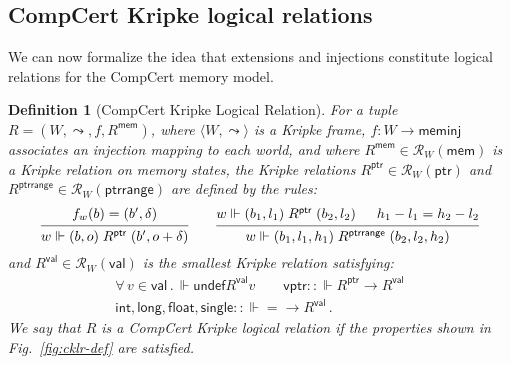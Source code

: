 \documentclass[draft,11pt]{report}
\newtheorem{definition}{Definition}
\newcommand{\kw}[1]{\ensuremath{ \mathsf{#1} }}
\begin{document}

\subsection{CompCert Kripke logical relations} \label{sec:cklrdef} %

We can now formalize the idea that
extensions and injections
constitute logical relations for the CompCert memory model.

\begin{definition}[CompCert Kripke Logical Relation] \label{def:cklr} %
For a tuple $R = (W, \leadsto, f, R^\kw{mem})$,
where
$\langle W, \leadsto \rangle$ is a Kripke frame,
$f : W \rightarrow \kw{meminj}$
associates an injection mapping to each world, and where
$R^\kw{mem} \in \mathcal{R}_{W}(\kw{mem})$
is a Kripke relation on memory states,
the Kripke relations
$R^\kw{ptr} \in \mathcal{R}_W(\kw{ptr})$ and
$R^\kw{ptrrange} \in \mathcal{R}_W(\kw{ptrrange})$
are defined by the rules:
\[
  \begin{prooftree}
    \hypo{f_w(b) = (b', \delta)}
    \infer1{w \Vdash (b, o) \mathrel{R^\kw{ptr}} (b', o + \delta)}
  \end{prooftree}
  \qquad
  \begin{prooftree}
    \hypo{w \Vdash (b_1, l_1) \mathrel{R^\kw{ptr}} (b_2, l_2)}
    \hypo{h_1 - l_1 = h_2 - l_2}
    \infer2{w \Vdash (b_1, l_1, h_1) \mathrel{R^\kw{ptrrange}} (b_2, l_2, h_2)}
  \end{prooftree}
\]
and
$R^\kw{val} \in \mathcal{R}_W(\kw{val})$
is the smallest Kripke relation satisfying:
\begin{gather*}
  \forall \, v \in \kw{val} \,.\,
    \Vdash \kw{undef} \mathrel{R^\kw{val}} v \qquad
  \kw{vptr} :: {\Vdash R^\kw{ptr} \rightarrow R^\kw{val}} \\
  \kw{int}, \kw{long}, \kw{float}, \kw{single} ::
    {\Vdash {=} \rightarrow R^\kw{val}} \,.
\end{gather*}
We say that $R$ is a \emph{CompCert Kripke logical relation}
if the properties shown in Fig.~\ref{fig:cklr-def} are satisfied.
\end{definition}
\end{document}
